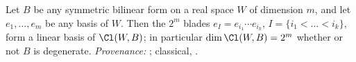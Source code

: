 Let $B$ be any symmetric bilinear form on a real space $W$ of dimension $m$, and let $e_1, \dots, e_m$ be any basis of $W$. Then the $2^m$ blades $e_I = e_{i_1} \cdots e_{i_k}$, $I = \{i_1 < \dots < i_k\}$, form a linear basis of $\Cl(W, B)$; in particular $\dim \Cl(W,B) = 2^m$ whether or not $B$ is degenerate. \emph{Provenance:} \cite[Lem.~2.6]{ButlerT4}; classical, \cite{Chevalley1997}.
